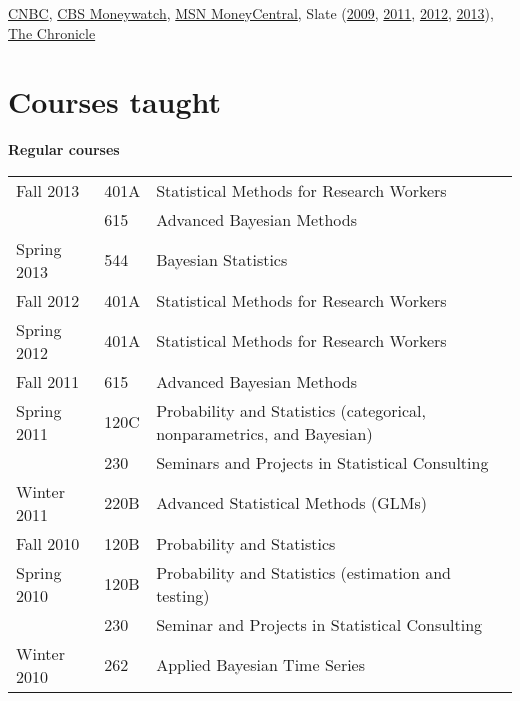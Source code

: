 \documentclass[overlapped,line]{res}
\begin{document}
\begin{resume}
\href{http://www.nbcnews.com/business/slam-dunk-your-rivals-office-march-madness-pool-1C8912546}{CNBC}, %
\href{http://moneywatch.bnet.com/economic-news/article/ncaa-brackets-how-to-win-your-march-madness-pool/403055/?tag=main;related-link-0}{CBS Moneywatch}, 
\href{http://articles.moneycentral.msn.com/SmartSpending/blog/page.aspx?post=1704157}{MSN MoneyCentral}, 
Slate (\href{http://www.slate.com/id/2213974/pagenum/all/}{2009}, \href{http://www.slate.com/id/2288234/pagenum/all/}{2011}, 
\href{http://www.slate.com/articles/sports/sports_nut/2012/03/ncaa_basketball_tournament_bracket_act_like_a_hedge_fund_manager_and_pick_ohio_state_to_win_it_all_.single.html}{2012}, 
\href{http://www.slate.com/articles/sports/sports_nut/2012/03/ncaa_basketball_tournament_bracket_act_like_a_hedge_fund_manager_and_pick_ohio_state_to_win_it_all_.single.html}{2013}),
\href{http://dukechronicle.com/node/145805}{The Chronicle}






\section{\bf Courses taught}
\vspace{0.1in}

{\bf Regular courses}

\begin{tabular}{lll}
Fall 2013 & 401A & Statistical Methods for Research Workers \\
& 615 & Advanced Bayesian Methods \\
Spring 2013 & 544 & Bayesian Statistics \\
Fall 2012 & 401A & Statistical Methods for Research Workers \\
Spring 2012 & 401A & Statistical Methods for Research Workers \\
Fall 2011 & 615 & Advanced Bayesian Methods \\
\hline
Spring 2011 & 120C & Probability and Statistics (categorical, nonparametrics, and Bayesian) \\
& 230 & Seminars and Projects in Statistical Consulting \\
Winter 2011 & 220B & Advanced Statistical Methods (GLMs) \\
Fall 2010  & 120B & Probability and Statistics \\
Spring 2010 & 120B & Probability and Statistics (estimation and testing) \\
 & 230 & Seminar and Projects in Statistical Consulting \\
Winter 2010 & 262 & Applied Bayesian Time Series
\end{tabular}


\end{resume}
\end{document}
